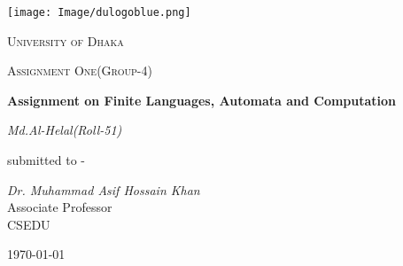 \documentclass[12pt,a4paper]{report}
\begin{document}
\begin{titlepage}
\centering
\texttt{[image: Image/dulogoblue.png]}\\
{\scshape\LARGE University of Dhaka \par}
\vspace{1cm}
{\scshape\Large Assignment One(Group-4)\par}
\vspace{1.5cm}
{\huge\bfseries Assignment on Finite Languages, Automata and Computation\par}
\vspace{2cm}
{\Large\itshape Md.Al-Helal(Roll-51)\par}
\vfill
submitted to -\par
{\itshape Dr. Muhammad Asif Hossain Khan}\\ Associate Professor\\CSEDU
\vfill
{\large \today\par}
\end{titlepage}
\end{document}

